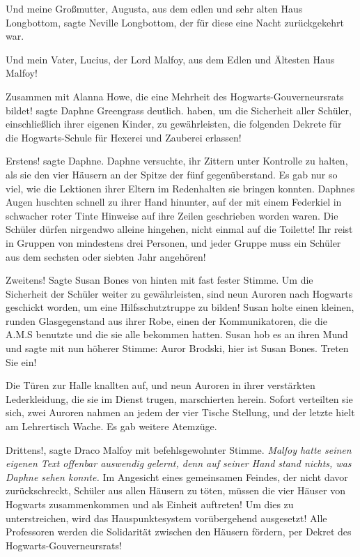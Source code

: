 \glqq Und meine Großmutter, Augusta, aus dem edlen und sehr alten Haus
Longbottom\grqq{}, sagte Neville Longbottom, der für diese eine Nacht
zurückgekehrt war.

\glqq Und mein Vater, Lucius, der Lord Malfoy, aus dem Edlen und Ältesten Haus
Malfoy!\grqq{}

\glqq Zusammen mit Alanna Howe, die eine Mehrheit des Hogwarts-Gouverneursrats
bildet!\grqq{} sagte Daphne Greengrass deutlich. \glqq haben, um die Sicherheit
aller Schüler, einschließlich ihrer eigenen Kinder, zu gewährleisten, die
folgenden Dekrete für die Hogwarts-Schule für Hexerei und Zauberei
erlassen!\grqq{}

\glqq Erstens!\grqq{} sagte Daphne. Daphne versuchte, ihr Zittern unter
Kontrolle zu halten, als sie den vier Häusern an der Spitze der fünf
gegenüberstand. Es gab nur so viel, wie die Lektionen ihrer Eltern im
Redenhalten sie bringen konnten. Daphnes Augen huschten schnell zu ihrer Hand
hinunter, auf der mit einem Federkiel in schwacher roter Tinte Hinweise auf ihre
Zeilen geschrieben worden waren. \glqq Die Schüler dürfen nirgendwo alleine
hingehen, nicht einmal auf die Toilette! Ihr reist in Gruppen von mindestens
drei Personen, und jeder Gruppe muss ein Schüler aus dem sechsten oder siebten
Jahr angehören!\grqq{}

\glqq Zweitens!\grqq{} Sagte Susan Bones von hinten mit fast fester Stimme.
\glqq Um die Sicherheit der Schüler weiter zu gewährleisten, sind neun Auroren
nach Hogwarts geschickt worden, um eine Hilfsschutztruppe zu bilden!\grqq{}
Susan holte einen kleinen, runden Glasgegenstand aus ihrer Robe, einen der
Kommunikatoren, die die A.M.S benutzte und die sie alle bekommen hatten. Susan
hob es an ihren Mund und sagte mit nun höherer Stimme: \glqq Auror Brodski, hier
ist Susan Bones. Treten Sie ein!\grqq{}

Die Türen zur Halle knallten auf, und neun Auroren in ihrer verstärkten
Lederkleidung, die sie im Dienst trugen, marschierten herein. Sofort verteilten
sie sich, zwei Auroren nahmen an jedem der vier Tische Stellung, und der letzte
hielt am Lehrertisch Wache. Es gab weitere Atemzüge.

\glqq Drittens!\grqq{}, sagte Draco Malfoy mit befehlsgewohnter Stimme.
\emph{Malfoy hatte seinen eigenen Text offenbar auswendig gelernt, denn auf
seiner Hand stand nichts, was Daphne sehen konnte.} \glqq Im Angesicht eines
gemeinsamen Feindes, der nicht davor zurückschreckt, Schüler aus allen Häusern
zu töten, müssen die vier Häuser von Hogwarts zusammenkommen und als Einheit
auftreten! Um dies zu unterstreichen, wird das Hauspunktesystem vorübergehend
ausgesetzt! Alle Professoren werden die Solidarität zwischen den Häusern
fördern, per Dekret des Hogwarts-Gouverneursrats!\grqq{}


